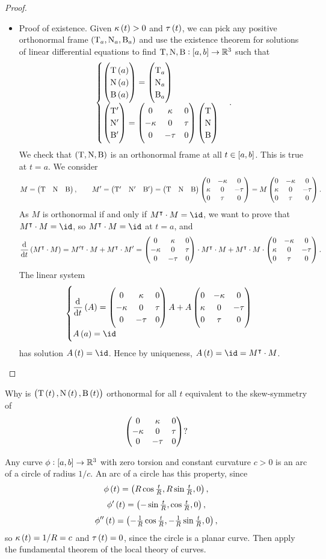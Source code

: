 \begin{proof}
\begin{itemize}
\pagebreak

\item Proof of existence. Given $ \kappa\br{t} > 0 $ and $ \tau\br{t} $, we can pick any positive orthonormal frame $ \br{\T_a, \N_a, \B_a} $ and use the existence theorem for solutions of linear differential equations to find $ \T, \N, \B : \sbr{a, b} \to \RR^3 $ such that
$$
\begin{cases}
\threebyone{\T\br{a}}{\N\br{a}}{\B\br{a}} = \threebyone{\T_a}{\N_a}{\B_a} \\
\threebyone{\T'}{\N'}{\B'} = \threebythree{0}{\kappa}{0}{-\kappa}{0}{\tau}{0}{-\tau}{0}\threebyone{\T}{\N}{\B}
\end{cases}.
$$
We check that $ \br{\T, \N, \B} $ is an orthonormal frame at all $ t \in \sbr{a, b} $. This is true at $ t = a $. We consider
$$ M = \begin{pmatrix} \mathrm{T} & \mathrm{N} & \mathrm{B} \end{pmatrix}, \qquad M' = \begin{pmatrix} \mathrm{T}' & \mathrm{N}' & \mathrm{B}' \end{pmatrix} = \begin{pmatrix} \mathrm{T} & \mathrm{N} & \mathrm{B} \end{pmatrix}\begin{pmatrix} 0 & -\kappa & 0 \\ \kappa & 0 & -\tau \\ 0 & \tau & 0 \end{pmatrix} = M\begin{pmatrix} 0 & -\kappa & 0 \\ \kappa & 0 & -\tau \\ 0 & \tau & 0 \end{pmatrix}. $$
As $ M $ is orthonormal if and only if $ M^\intercal \cdot M = \id $, we want to prove that $ M^\intercal \cdot M = \id $, so $ M^\intercal \cdot M = \id $ at $ t = a $, and
$$ \dod{}{t}\br{M^\intercal \cdot M} = M'^\intercal \cdot M + M^\intercal \cdot M' = \threebythree{0}{\kappa}{0}{-\kappa}{0}{\tau}{0}{-\tau}{0} \cdot M^\intercal \cdot M + M^\intercal \cdot M \cdot \threebythree{0}{-\kappa}{0}{\kappa}{0}{-\tau}{0}{\tau}{0}. $$
The linear system
$$
\begin{cases}
\dod{}{t}\br{A} = \threebythree{0}{\kappa}{0}{-\kappa}{0}{\tau}{0}{-\tau}{0}A + A\threebythree{0}{-\kappa}{0}{\kappa}{0}{-\tau}{0}{\tau}{0} \\
A\br{a} = \id
\end{cases}
$$
has solution $ A\br{t} = \id $. Hence by uniqueness, $ A\br{t} = \id = M^\intercal \cdot M $.
\end{itemize}
\end{proof}

\begin{exercise*}
Why is $ \br{\T\br{t}, \N\br{t}, \B\br{t}} $ orthonormal for all $ t $ equivalent to the skew-symmetry of
$$ \begin{pmatrix} 0 & \kappa & 0 \\ -\kappa & 0 & \tau \\ 0 & -\tau & 0 \end{pmatrix}? $$
\end{exercise*}


\begin{example*}
Any curve $ \phi : \sbr{a, b} \to \RR^3 $ with zero torsion and constant curvature $ c > 0 $ is an arc of a circle of radius $ 1 / c $. An arc of a circle has this property, since
$$ \phi\br{t} = \br{R\cos \tfrac{t}{R}, R\sin \tfrac{t}{R}, 0}, $$
$$ \phi'\br{t} = \br{-\sin \tfrac{t}{R}, \cos \tfrac{t}{R}, 0}, $$
$$ \phi''\br{t} = \br{-\tfrac{1}{R}\cos \tfrac{t}{R}, -\tfrac{1}{R}\sin \tfrac{t}{R}, 0}, $$
so $ \kappa\br{t} = 1 / R = c $ and $ \tau\br{t} = 0 $, since the circle is a planar curve. Then apply the fundamental theorem of the local theory of curves.
\end{example*}

